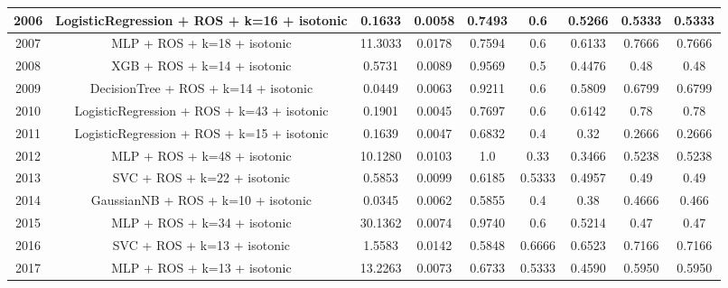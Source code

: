 \begin{table}[h]
{{{\begin{tabular}{ccccccccc}
2006 & LogisticRegression + ROS + k=16 + isotonic & 0.1633        & 0.0058        & 0.7493           & 0.6              & 0.5266   & 0.5333         & 0.5333           \\ \hline
2007 & MLP + ROS + k=18 + isotonic                & 11.3033       & 0.0178        & 0.7594           & 0.6              & 0.6133   & 0.7666         & 0.7666           \\ \hline
2008 & XGB + ROS + k=14 + isotonic                & 0.5731        & 0.0089        & 0.9569           & 0.5              & 0.4476   & 0.48           & 0.48             \\ \hline
2009 & DecisionTree + ROS + k=14 + isotonic       & 0.0449        & 0.0063        & 0.9211           & 0.6              & 0.5809   & 0.6799         & 0.6799           \\ \hline
2010 & LogisticRegression + ROS + k=43 + isotonic & 0.1901        & 0.0045        & 0.7697           & 0.6              & 0.6142   & 0.78           & 0.78             \\ \hline
2011 & LogisticRegression + ROS + k=15 + isotonic & 0.1639        & 0.0047        & 0.6832           & 0.4              & 0.32     & 0.2666         & 0.2666           \\ \hline
2012 & MLP + ROS + k=48 + isotonic                & 10.1280       & 0.0103        & 1.0              & 0.33             & 0.3466   & 0.5238         & 0.5238           \\ \hline
2013 & SVC + ROS + k=22 + isotonic                & 0.5853        & 0.0099        & 0.6185           & 0.5333           & 0.4957   & 0.49           & 0.49             \\ \hline
2014 & GaussianNB + ROS + k=10 + isotonic         & 0.0345        & 0.0062        & 0.5855           & 0.4              & 0.38     & 0.4666         & 0.466            \\ \hline
2015 & MLP + ROS + k=34 + isotonic                & 30.1362       & 0.0074        & 0.9740           & 0.6              & 0.5214   & 0.47           & 0.47             \\ \hline
2016 & SVC + ROS + k=13 + isotonic                & 1.5583        & 0.0142        & 0.5848           & 0.6666           & 0.6523   & 0.7166         & 0.7166           \\ \hline
2017 & MLP + ROS + k=13 + isotonic                & 13.2263       & 0.0073        & 0.6733           & 0.5333           & 0.4590   & 0.5950         & 0.5950           \\ \hline

\end{tabular}}}}
\end{table}
